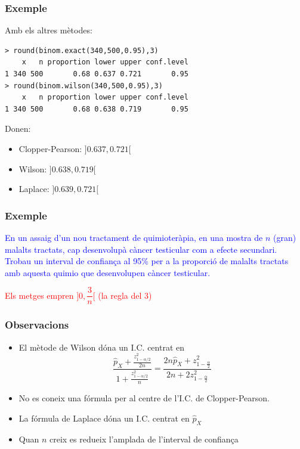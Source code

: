\documentclass[12pt,t]{beamer}
\newcommand{\red}[1]{\textcolor{red}{#1}}
\newcommand{\blue}[1]{\textcolor{blue}{#1}}
\theoremstyle{plain}
\theoremstyle{definition}
\begin{document}
\begin{frame}[fragile]
\frametitle{Exemple}


Amb els altres mètodes:
\begin{verbatim}
> round(binom.exact(340,500,0.95),3)
    x   n proportion lower upper conf.level
1 340 500       0.68 0.637 0.721       0.95
> round(binom.wilson(340,500,0.95),3)
    x   n proportion lower upper conf.level
1 340 500       0.68 0.638 0.719       0.95
\end{verbatim}
Donen:
\medskip

\begin{itemize}
\item Clopper-Pearson: $]0.637,0.721[$
\medskip

\item Wilson: $]0.638, 0.719[$
\medskip

\item Laplace: $]0.639,0.721[$
\end{itemize}

\end{frame}

\begin{frame}
\frametitle{Exemple}

\blue{En un assaig d'un nou tractament de quimioteràpia, en una mostra de $n$ (gran) malalts tractats, cap desenvolupà càncer testicular com a efecte secundari. Trobau un interval de confiança al 95\% per a la proporció de malalts tractats amb aquesta quimio que desenvolupen càncer testicular.}
\vspace*{4cm}

\red{Els metges empren $\Big]0,\dfrac{3}{n}\Big[$ (la regla del 3)}


\end{frame}


\begin{frame}
\frametitle{Observacions}
\begin{itemize}
\item El mètode de Wilson dóna un I.C. centrat en
$$
\frac{\widehat{p}_{X}+\frac{z_{1-{\alpha}/{2}}^2}{2n}}{1+\frac{z_{1-{\alpha}/{2}}^2}{n}}
=\frac{2n\widehat{p}_{X}+ z_{1-\frac{\alpha}{2}}^2}{2n+2 z_{1-\frac{\alpha}{2}}^2}
$$

\item No es coneix una fórmula per al centre de l'I.C. de Clopper-Pearson.


\item La fórmula de Laplace dóna un I.C.  centrat en $\widehat{p}_{X}$
\medskip

\item Quan $n$ creix es redueix l'amplada de l'interval de confiança

\end{itemize}

\end{frame}
\end{document}
